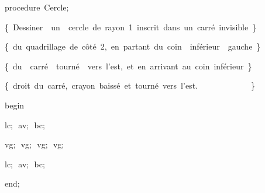 {\pagebreak[3] 
\vspace{\neglskip}\mbox{\blc  \blk\idt  \mcl procedure\idt \ Cercle$;$}\par 
\vspace{\neglskip}\mbox{\blc  \blk\blk\idt  \cmt  \{\ Dessiner\ \ un\ \ cercle\ de\ rayon\ 1\ inscrit\ dans\ un\ carr\'{e}\ invisible\ \}\idt }\par 
\vspace{\neglskip}\mbox{\blc  \blk\blk\idt  \cmt  \{\ du\ quadrillage\ de\ c\^{o}t\'{e}\ 2,\ en\ partant\ du\ coin\ \ inf\'{e}rieur\ \ gauche\ \}\idt }\par 
\vspace{\neglskip}\mbox{\blc  \blk\blk\idt  \cmt  \{\ du\ \ carr\'{e}\ \ tourn\'{e}\ \ vers\ l{'}est,\ et\ en\ arrivant\ au\ coin\ inf\'{e}rieur\ \}\idt }\par 
\vspace{\neglskip}\mbox{\blc  \blk\blk\idt  \cmt  \{\ droit\ du\ carr\'{e},\ crayon\ baiss\'{e}\ et\ tourn\'{e}\ vers\ l{'}est.\ \ \ \ \ \ \ \ \ \ \ \ \ \}\idt }\par 
\vspace{\neglskip}\mbox{\blc  \blk\idt  \mcl begin\idt \ }\par 
\vspace{\neglskip}\mbox{\blc  \blk\blk\idt  lc$;$\ av$;$\ bc$;$\ }\par 
\vspace{\neglskip}\mbox{\blc  \blk\blk\idt  vg$;$\ vg$;$\ vg$;$\ vg$;$\ }\par 
\vspace{\neglskip}\mbox{\blc  \blk\blk\idt  lc$;$\ av$;$\ bc$;$\ }\par 
\vspace{\neglskip}\mbox{\blc  \blk\idt  \mcl end\idt $;$}\par 
\medskip

}
